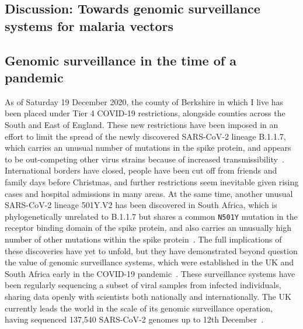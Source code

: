 \begin{refsection}
\chapter[Discussion]{Discussion: Towards genomic surveillance systems for malaria vectors}\label{ch:7}


\section{Genomic surveillance in the time of a pandemic}\label{sec:discuss-pandemic}


As of Saturday 19 December 2020, the county of Berkshire in which I live has been placed under Tier 4 COVID-19 restrictions, alongside counties across the South and East of England.
%
These new restrictions have been imposed in an effort to limit the spread of the newly discovered SARS-CoV-2 lineage B.1.1.7, which carries an unusual number of mutations in the spike protein, and appears to be out-competing other virus strains because of increased transmissibility~\parencite{Rambaut2020,Davies2020}.
%
International borders have closed, people have been cut off from friends and family days before Christmas, and further restrictions seem inevitable given rising cases and hospital admissions in many areas.
%
At the same time, another unusual SARS-CoV-2 lineage 501Y.V2 has been discovered in South Africa, which is phylogenetically unrelated to B.1.1.7 but shares a common \texttt{N501Y} mutation in the receptor binding domain of the spike protein, and also carries an unusually high number of other mutations within the spike protein~\parencite{Tegally2020}.
%
The full implications of these discoveries have yet to unfold, but they have demonstrated beyond question the value of genomic surveillance systems, which were established in the UK and South Africa early in the COVID-19 pandemic~\parencite{COGUK2020a,Msomi2020}.
%
These surveillance systems have been regularly sequencing a subset of viral samples from infected individuals, sharing data openly with scientists both nationally and internationally.
%
The UK currently leads the world in the scale of its genomic surveillance operation, having sequenced 137,540 SARS-CoV-2 genomes up to 12th December~\parencite{COGUK2020b}.



\end{refsection}
